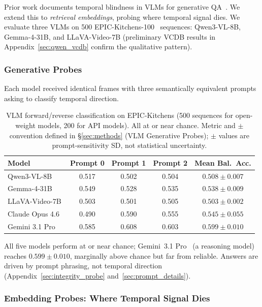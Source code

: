 \documentclass{article}
\theoremstyle{remark}
\begin{document}
Prior work documents temporal blindness in VLMs for generative QA~\cite{tomato,temporalbench,tempcompass,infact,videozerobench}. We extend this to \emph{retrieval embeddings}, probing where temporal signal dies. We evaluate three VLMs on 500 EPIC-Kitchens-100~\cite{epickitchens} sequences: Qwen3-VL-8B, Gemma-4-31B, and LLaVA-Video-7B (preliminary VCDB results in Appendix~\ref{sec:qwen_vcdb} confirm the qualitative pattern).

\subsubsection{Generative Probes}
\label{sec:vlm_generative}

Each model received identical frames with three semantically equivalent prompts asking to classify temporal direction.

\begin{table}[ht]
\centering
\caption{VLM forward/reverse classification on EPIC-Kitchens (500 sequences for open-weight models, 200 for API models). All at or near chance. Metric and $\pm$ convention defined in \S\ref{sec:methods} (VLM Generative Probes); $\pm$ values are prompt-sensitivity SD, not statistical uncertainty.}
\label{tab:vlm_generative}
\begin{tabular}{lcccc}
\toprule
\textbf{Model} & \textbf{Prompt 0} & \textbf{Prompt 1} & \textbf{Prompt 2} & \textbf{Mean Bal.\ Acc.} \\
\midrule
Qwen3-VL-8B & 0.517 & 0.502 & 0.504 & $0.508 \pm 0.007$ \\
Gemma-4-31B & 0.549 & 0.528 & 0.535 & $0.538 \pm 0.009$ \\
LLaVA-Video-7B & 0.503 & 0.501 & 0.505 & $0.503 \pm 0.002$ \\
\midrule
Claude Opus 4.6~\cite{claude4opus} & 0.490 & 0.590 & 0.555 & $0.545 \pm 0.055$ \\
Gemini 3.1 Pro & 0.585 & 0.608 & 0.603 & $0.599 \pm 0.010$ \\
\bottomrule
\end{tabular}
\end{table}

All five models perform at or near chance; Gemini~3.1 Pro~\cite{gemini31pro} (a reasoning model) reaches $0.599 \pm 0.010$, marginally above chance but far from reliable. Answers are driven by prompt phrasing, not temporal direction (Appendix~\ref{sec:integrity_probe} and~\ref{sec:prompt_details}).

\subsubsection{Embedding Probes: Where Temporal Signal Dies}
\label{sec:vlm_embedding}
\end{document}

